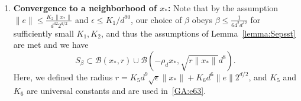 \begin{enumerate}
Combining~\eqref{eta-minus-vtilde} and~\eqref{GA:le30}, we get that
\begin{align*}
\|v_{\hat{x}_{i}} - {v}_{\tilde{x}_{i}}\|
\leq&
\left(
\frac{5}{6}  + \nu b_1 \frac{d^2}{2^d}
\right)
\|{v}_{\tilde{x}_i} \|,
\end{align*}
with the appropriate constants chosen sufficiently small, where $b_1$ is a universal constant. Choosing $v_{\hat{x}_i} = \eta_{\hat{x}_{i}}$ yields
\begin{equation} \label{GA:e62}
\|\eta_{\hat{x}_{i}} - {v}_{\tilde{x}_i}\| \leq \biggl(\frac{5}{6}  + \nu b_0 \frac{d^2}{2^d}\biggr) \| {v}_{\tilde{x}_i} \|.
\end{equation}
Therefore, combining~\eqref{GA:e21} and~\eqref{GA:e62} yields
\begin{equation} \label{GA:e72}
f(\tilde{x}_i - \nu {v}_{\tilde{x}_i}) - f(\tilde{x}_i) \leq - \frac{1}{12} \nu \|{v}_{\tilde{x}_i}\|^2,
\end{equation}
where we used that $\nu b_0 \frac{d^2}{2^d} \leq 1 / 12$ by the assumption that the step size obeys $\nu = K_3 2^d / d^2$ and by
taking $K_3$ appropriately small.
Applying~\eqref{GA:e71} to \eqref{GA:e72} yields
\begin{equation*}
f(\tilde{x}_i - \nu {v}_{\tilde{x}_i}) - f(\tilde{x}_i) \leq - \frac{1}{12} \nu \|{v}_{\tilde{x}_i}\|^2 \leq - 2^{-d} d^4 b_1 \epsilon \|x_*\|^2,
\end{equation*}
where $b_1$ is a universal constant and we used $\nu = K_3 \frac{2^d}{d^2}$. Therefore, there can be at most $\frac{f(x_0) 2^d}{b_1 d^4 \epsilon \|x_*\|^2}$ iterations for which $\tilde{x}_i \notin S_\beta$. In other words, there exists $N \leq \frac{f(x_0) 2^d}{b_1 d^4 \epsilon \|x_*\|^2}$ such that $\tilde{x}_N \in S_\beta$.

\item {\bf Convergence to a neighborhood of $x_*$:}
Note that by the assumption $\|e\| \leq \frac{K_2 \|x_*\| }{d^{42} 2^{d/2} }$ and $\epsilon \leq K_1 / d^{90}$,
our choice of $\beta$ obeys $\beta \leq \frac{1}{64^2 d^{12}}$ for sufficiently small $K_1, K_2$, and thus the assumptions of Lemma~\ref{lemma:Sepsst} are met and we have
\begin{equation} \label{GA:e69}
S_\beta
\subset
\mathcal{B}(x_*, r)
\cup
\mathcal{B}( - \rho_d x_*, \sqrt{r \|x_*\|} d^8).
\end{equation}
Here, we defined the radius
$r = K_{5} d^9 \sqrt{\epsilon} \|x_*\| + K_{6} d^6 \|e\| 2^{d/2}$, and $K_{5}$ and $K_{6}$ are universal constants and are used in~\eqref{GA:e63}.


\end{enumerate}
